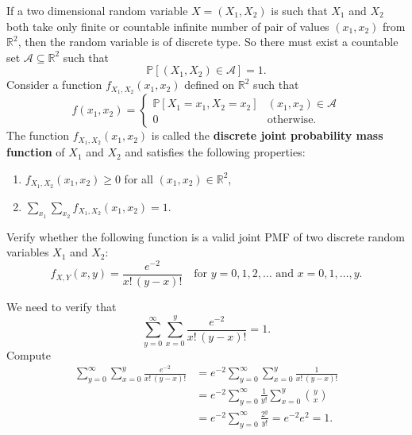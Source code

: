 \begin{definition}
    If a two dimensional random variable $X = (X_1, X_2)$ is such that $X_1$ and $X_2$ both take 
    only finite or countable infinite number of pair of values $(x_1, x_2)$ from $\mathbb{R}^2$, then 
    the random variable is of discrete type. So there must exist a countable set $\mathcal{A} \subseteq \mathbb{R}^2$ such that 
    \[
        \mathbb{P}[(X_1, X_2) \in \mathcal{A}] = 1.
    \]
    Consider a function $f_{X_1, X_2}(x_1, x_2)$ defined on $\mathbb{R}^2$ such that
    \begin{equation}
        f(x_1, x_2) = \begin{cases}
            \mathbb{P}[X_1 = x_1, X_2 = x_2] & (x_1, x_2) \in \mathcal{A}\\
            0 & \text{otherwise}.
        \end{cases}
    \end{equation}
    The function $f_{X_1, X_2}(x_1, x_2)$ is called the \textbf{discrete joint probability mass function} of $X_1$ and $X_2$ and satisfies the following properties:
    \begin{enumerate}
        \item $f_{X_1, X_2}(x_1, x_2) \geq 0$ for all $(x_1, x_2) \in \mathbb{R}^2$,
        \item $\displaystyle \sum_{x_1} \sum_{x_2} f_{X_1, X_2}(x_1, x_2) = 1$.
    \end{enumerate}
\end{definition}

\begin{example}
    Verify whether the following function is a valid joint PMF of two discrete random variables $X_1$ and $X_2$:
    \[
        f_{X, Y}(x, y) = \frac{e^{-2}}{x! \, (y-x)!} \quad \text{for } y = 0, 1, 2, \ldots \text{ and } x = 0, 1, \ldots, y.
    \]
\end{example}
\begin{solution}
    We need to verify that 
    \[
        \sum^\infty_{y=0} \sum^y_{x=0} \frac{e^{-2}}{x! \, (y-x)!} = 1.
    \]
    Compute
    \begin{align*}
        \sum^\infty_{y=0} \sum^y_{x=0} \frac{e^{-2}}{x! \, (y-x)!} &= e^{-2} \sum^\infty_{y=0} \sum^y_{x=0} \frac{1}{x! \, (y-x)!}\\
        &= e^{-2} \sum^\infty_{y=0} \frac{1}{y!} \sum^y_{x=0} \binom{y}{x}\\
        &= e^{-2} \sum^\infty_{y=0} \frac{2^y}{y!} = e^{-2} e^2 = 1.
    \end{align*}
\end{solution}

